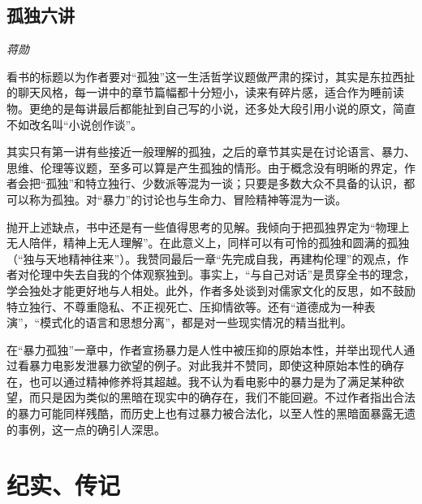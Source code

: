\subsection*{孤独六讲}
\par \emph{蒋勋} 

\par 看书的标题以为作者要对“孤独”这一生活哲学议题做严肃的探讨，其实是东拉西扯的聊天风格，每一讲中的章节篇幅都十分短小，读来有碎片感，适合作为睡前读物。更绝的是每讲最后都能扯到自己写的小说，还多处大段引用小说的原文，简直不如改名叫“小说创作谈”。
\par 其实只有第一讲有些接近一般理解的孤独，之后的章节其实是在讨论语言、暴力、思维、伦理等议题，至多可以算是产生孤独的情形。由于概念没有明晰的界定，作者会把“孤独”和特立独行、少数派等混为一谈；只要是多数大众不具备的认识，都可以称为孤独。对“暴力”的讨论也与生命力、冒险精神等混为一谈。
\par 抛开上述缺点，书中还是有一些值得思考的见解。我倾向于把孤独界定为“物理上无人陪伴，精神上无人理解”。在此意义上，同样可以有可怜的孤独和圆满的孤独（“独与天地精神往来”）。我赞同最后一章“先完成自我，再建构伦理”的观点，作者对伦理中失去自我的个体观察独到。事实上，“与自己对话”是贯穿全书的理念，学会独处才能更好地与人相处。此外，作者多处谈到对儒家文化的反思，如不鼓励特立独行、不尊重隐私、不正视死亡、压抑情欲等。还有“道德成为一种表演”，“模式化的语言和思想分离”，都是对一些现实情况的精当批判。
\par 在“暴力孤独”一章中，作者宣扬暴力是人性中被压抑的原始本性，并举出现代人通过看暴力电影发泄暴力欲望的例子。对此我并不赞同，即使这种原始本性的确存在，也可以通过精神修养将其超越。我不认为看电影中的暴力是为了满足某种欲望，而只是因为类似的黑暗在现实中的确存在，我们不能回避。不过作者指出合法的暴力可能同样残酷，而历史上也有过暴力被合法化，以至人性的黑暗面暴露无遗的事例，这一点的确引人深思。
\par {}


\section{纪实、传记}

